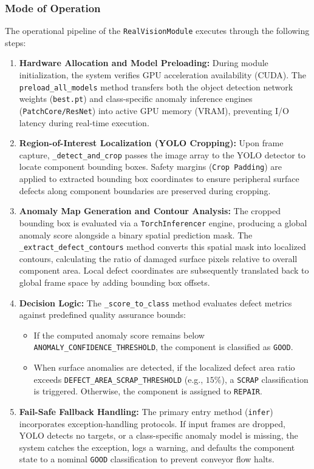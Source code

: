 \documentclass{article}
\begin{document}
\subsubsection{Mode of Operation}
The operational pipeline of the \texttt{RealVisionModule} executes through the following steps:

\begin{enumerate}
	\item \textbf{Hardware Allocation and Model Preloading:} During module initialization, the system verifies GPU acceleration availability (CUDA). The \texttt{preload\_all\_models} method transfers both the object detection network weights (\texttt{best.pt}) and class-specific anomaly inference engines (\texttt{PatchCore/ResNet}) into active GPU memory (VRAM), preventing I/O latency during real-time execution.
	
	\item \textbf{Region-of-Interest Localization (YOLO Cropping):} Upon frame capture, \texttt{\_detect\_and\_crop} passes the image array to the YOLO detector to locate component bounding boxes. Safety margins (\texttt{Crop Padding}) are applied to extracted bounding box coordinates to ensure peripheral surface defects along component boundaries are preserved during cropping.
	
	\item \textbf{Anomaly Map Generation and Contour Analysis:} The cropped bounding box is evaluated via a \texttt{TorchInferencer} engine, producing a global anomaly score alongside a binary spatial prediction mask. The \texttt{\_extract\_defect\_contours} method converts this spatial mask into localized contours, calculating the ratio of damaged surface pixels relative to overall component area. Local defect coordinates are subsequently translated back to global frame space by adding bounding box offsets.
	
	\item \textbf{Decision Logic:} The \texttt{\_score\_to\_class} method evaluates defect metrics against predefined quality assurance bounds:
	\begin{itemize}
		\item If the computed anomaly score remains below \texttt{ANOMALY\_CONFIDENCE\_THRESHOLD}, the component is classified as \texttt{GOOD}.
		\item When surface anomalies are detected, if the localized defect area ratio exceeds \texttt{DEFECT\_AREA\_SCRAP\_THRESHOLD} (e.g., $15\%$), a \texttt{SCRAP} classification is triggered. Otherwise, the component is assigned to \texttt{REPAIR}.
	\end{itemize}
	
	\item \textbf{Fail-Safe Fallback Handling:} The primary entry method (\texttt{infer}) incorporates exception-handling protocols. If input frames are dropped, YOLO detects no targets, or a class-specific anomaly model is missing, the system catches the exception, logs a warning, and defaults the component state to a nominal \texttt{GOOD} classification to prevent conveyor flow halts.
\end{enumerate}
\end{document}
